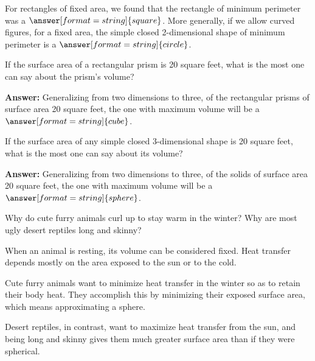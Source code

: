 \documentclass[nooutcomes]{ximera}
\begin{document}
\begin{problem}
For rectangles of fixed area, we found that the rectangle of minimum perimeter was a 
$\answer[format=string]{square}$.  More generally, if we allow curved figures, for a fixed area, the simple closed 2-dimensional shape of minimum perimeter is a $\answer[format=string]{circle}$.  
\end{problem}

\begin{problem}
If the surface area of a rectangular prism is 20 square feet, what is the most one can say about the prism's volume?  

\textbf{Answer:} Generalizing from two dimensions to three, of the rectangular prisms of surface area 20 square feet, the one with maximum volume will be a $\answer[format=string]{cube}$.

\begin{problem}
If the surface area of any simple closed 3-dimensional shape is 20 square feet, what is the most one can say about its volume? 

\textbf{Answer:} Generalizing from two dimensions to three, of the solids of surface area 20 square feet, the one with maximum volume will be a $\answer[format=string]{sphere}$.
\end{problem}
\end{problem}

\begin{problem}
Why do cute furry animals curl up to stay warm in the winter?  Why are most ugly desert reptiles long and skinny?

\begin{freeResponse}
\end{freeResponse}
\begin{hint}
When an animal is resting, its volume can be considered fixed.  Heat transfer depends mostly on the area exposed to the sun or to the cold.  

Cute furry animals want to minimize heat transfer in the winter so as to retain their body heat.  They accomplish this by minimizing their exposed surface area, which means approximating a sphere. 

Desert reptiles, in contrast, want to maximize heat transfer from the sun, and being long and skinny gives them much greater surface area than if they were spherical.  
\end{hint}
\end{problem}
\end{document}
